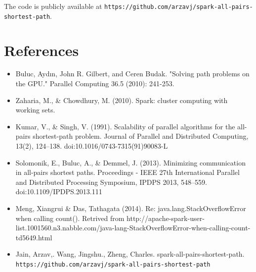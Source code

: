 \documentclass{article} %
\begin{document}
The code is publicly available at {\tt https://github.com/arzavj/spark-all-pairs-shortest-path}.

\section{References}
\begin{itemize}
\item Buluc, Aydın, John R. Gilbert, and Ceren Budak. "Solving path problems on the GPU." Parallel Computing 36.5 (2010): 241-253.
\item Zaharia, M., \& Chowdhury, M. (2010). Spark: cluster computing with working sets.
\item Kumar, V., \& Singh, V. (1991). Scalability of parallel algorithms for the all-pairs shortest-path problem. Journal of Parallel and Distributed Computing, 13(2), 124–138. doi:10.1016/0743-7315(91)90083-L
\item Solomonik, E., Buluc, A., \& Demmel, J. (2013). Minimizing communication in all-pairs shortest paths. Proceedings - IEEE 27th International Parallel and Distributed Processing Symposium, IPDPS 2013, 548–559. doi:10.1109/IPDPS.2013.111
\item Meng, Xiangrui \& Das, Tathagata (2014). Re: java.lang.StackOverflowError when calling count(). Retrived from http://apache-spark-user-list.1001560.n3.nabble.com/java-lang-StackOverflowError-when-calling-count-td5649.html
\item Jain, Arzav,. Wang, Jingshu., Zheng, Charles. spark-all-pairs-shortest-path. 
{\tt https://github.com/arzavj/spark-all-pairs-shortest-path}
\end{itemize}
\end{document}
